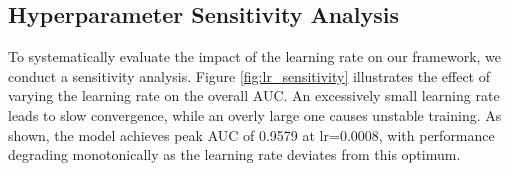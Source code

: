 \documentclass[runningheads]{llncs}
\begin{document}





\subsection{Hyperparameter Sensitivity Analysis}
To systematically evaluate the impact of the learning rate on our framework, we conduct a sensitivity analysis. Figure \ref{fig:lr_sensitivity} illustrates the effect of varying the learning rate on the overall AUC. An excessively small learning rate leads to slow convergence, while an overly large one causes unstable training. As shown, the model achieves peak AUC of 0.9579 at lr=0.0008, with performance degrading monotonically as the learning rate deviates from this optimum.
\end{document}
